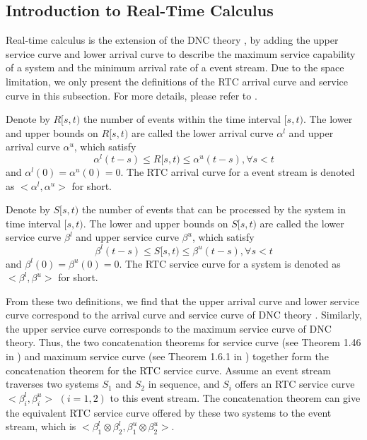 \documentclass[preprint]{elsarticle}
\begin{document}
\subsection{Introduction to Real-Time Calculus}\label{intrortc}
Real-time calculus \cite{1253607} is the extension of the DNC theory \cite{Boudec2001Network}, by adding the upper service curve and lower arrival curve to describe the maximum service capability of a system and the minimum arrival rate of a event stream. Due to the space limitation, we only present the definitions of the RTC arrival curve and service curve in this subsection. For more details, please refer to \cite{1253607}.
\begin{rmk}\label{acu}
Denote by $R[s,t)$ the number of events within the time interval $[s,t)$. The lower and upper bounds on $R[s,t)$ are called the lower arrival curve $\alpha^l$ and upper arrival curve $\alpha^u$, which satisfy
$$\alpha^l(t-s)\leq R[s,t)\leq \alpha^u(t-s),\forall s<t$$
and $\alpha^l(0)=\alpha^u(0)=0$. The RTC arrival curve for a event stream is denoted as $<\alpha^l,\alpha^u>$ for short.
\end{rmk}

\begin{rmk}
Denote by $S[s,t)$ the number of events that can be processed by the system in time interval $[s,t)$. The lower and upper bounds on $S[s,t)$ are called the lower service curve $\beta^l$ and upper service curve $\beta^u$, which satisfy
$$\beta^l(t-s)\leq S[s,t)\leq \beta^u(t-s),\forall s<t$$
and $\beta^l(0)=\beta^u(0)=0$. The RTC service curve for a system is denoted as $<\beta^l,\beta^u>$ for short.
\end{rmk}

From these two definitions, we find that the upper arrival curve and lower service curve correspond to the arrival curve and service curve of DNC theory \cite{Boudec2001Network}. Similarly, the upper service curve corresponds to the maximum service curve of DNC theory. Thus, the two concatenation theorems for service curve (see Theorem 1.46 in \cite{Boudec2001Network}) and maximum service curve (see Theorem 1.6.1 in \cite{Boudec2001Network}) together form the concatenation theorem for the RTC service curve. Assume an event stream traverses two systems $S_1$ and $S_2$ in sequence, and $S_i$ offers an RTC service curve $<\beta^l_i,\beta^u_i>$ $(i=1,2)$ to this event stream. The concatenation theorem can give the equivalent RTC service curve offered by these two systems to the event stream, which is $<\beta^l_1\otimes\beta^l_2,\beta^u_1\otimes\beta^u_2>$.
\end{document}
